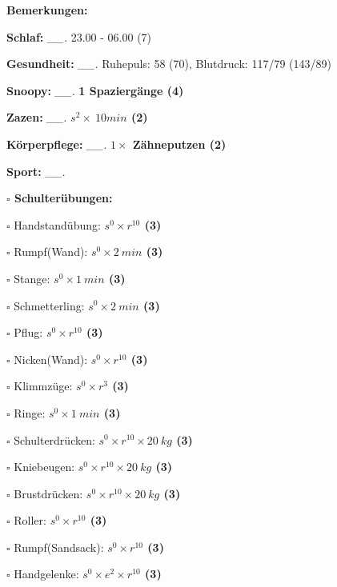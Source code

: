 \documentclass[10pt,a4paper]{article}
\newcommand\prop[1] {{\color {alizarin} {\bf #1}}}             %
\newcommand\draf[1] {{\color {amber(sae/ece)} {\bf #1}}}       %
\newcommand\mand[1] {{\color {burntorange} {\bf #1}}}          %
\newcommand\topspace{\vskip -15pt \hskip 20pt}
\newcommand\n[1] { {\sl #1.} \hskip 5pt }
\begin{document}
\begin{mdframed}[style=daystyle]
  \begin{labeling}{{\mand {Bemerkungen:}}}
    \setlength\itemsep{-3pt}
  \item[{\mand {Schlaf:}}]       \n{\_\_} 23.00 - 06.00 (7)
  \item[{\mand {Gesundheit:}}]   \n{\_\_} Ruhepuls: 58 (70), Blutdruck: 117/79 (143/89)
  \item[{\mand {Snoopy:}}]       \n{\_\_} {\draf {1 Spaziergänge (4)}}    
  \item[{\mand {Zazen:}}]        \n{\_\_} {\draf {$s^2 \times\ 10 min$ (2)}}
  \item[{\mand {Körperpflege:}}] \n{\_\_} {\draf {$1 \times$ Zähneputzen (2)}}
  \item[{\mand {Sport:}}]        \n{\_\_}
    \topspace
    \begin{minipage}{0.75\textwidth}  
      \begin{labeling}{\prop {$\square$ {Schulterübungen:}}} 
        \setlength\itemsep{-3pt}
      \item[$\square$ Handstandübung:]  {\prop {$s^0 \times r^{10}$ (3)}}
      \item[$\square$ Rumpf(Wand):]     {\prop {$s^0 \times 2\ min$ (3)}}
      \item[$\square$ Stange:]          {\prop {$s^0 \times 1\ min$ (3)}}
      \item[$\square$ Schmetterling:]   {\prop {$s^0 \times 2\ min$ (3)}}
      \item[$\square$ Pflug:]           {\prop {$s^0 \times r^{10}$ (3)}}
      \item[$\square$ Nicken(Wand):]    {\prop {$s^0 \times r^{10}$ (3)}}
      \item[$\square$ Klimmzüge:]       {\prop {$s^0 \times r^3$ (3)}}
      \item[$\square$ Ringe:]           {\prop {$s^0 \times 1\ min$ (3)}}
      \item[$\square$ Schulterdrücken:] {\prop {$s^0 \times r^{10} \times 20\ kg$ (3)}}
      \item[$\square$ Kniebeugen:]      {\prop {$s^0 \times r^{10} \times 20\ kg$ (3)}}
      \item[$\square$ Brustdrücken:]    {\prop {$s^0 \times r^{10} \times 20\ kg$ (3)}}
      \item[$\square$ Roller:]          {\prop {$s^0 \times r^{10}$ (3)}}
      \item[$\square$ Rumpf(Sandsack):] {\prop {$s^0 \times r^{10}$ (3)}}
      \item[$\square$ Handgelenke:]     {\prop {$s^0 \times e^2 \times r^{10}$ (3)}}

\end{labeling}
\end{minipage}
\end{labeling}
\end{mdframed}
\end{document}

